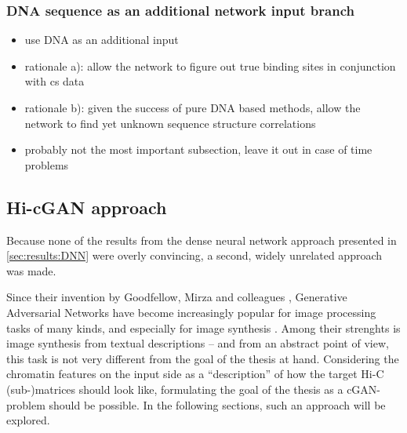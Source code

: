  

\subsubsection{DNA sequence as an additional network input branch}
\begin{itemize}
 \item use DNA as an additional input
 \item rationale a): allow the network to figure out true binding sites in conjunction with cs data
 \item rationale b): given the success of pure DNA based methods, allow the network to find yet unknown sequence structure correlations
 \item probably not the most important subsection, leave it out in case of time problems
\end{itemize}

\subsection{Hi-cGAN approach} \label{sec:hi-cGAN}
Because none of the results from the dense neural network approach presented in \cref{sec:results:DNN} were overly convincing,
a second, widely unrelated approach was made.

Since their invention by Goodfellow, Mirza and colleagues \cite{Goodfellow2014, mirza2014},
Generative Adversarial Networks have become increasingly popular for image processing tasks of many kinds,
and especially for image synthesis \cite{Wang2020}. 
Among their strenghts is image synthesis from textual descriptions \cite{Reed2016,Zhang2019c,Zhu2019,Tao2020} --
and from an abstract point of view, this task is not very different from the goal of the thesis at hand.
Considering the chromatin features on the input side as a ``description'' of how the target Hi-C (sub-)matrices should look like,
formulating the goal of the thesis as a cGAN-problem should be possible.
In the following sections, such an approach will be explored.

